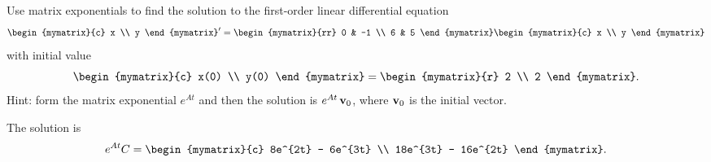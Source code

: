 \begin{ex}
  Use matrix exponentials to find the solution to the
  first-order linear differential equation
  \begin{equation*}
    \begin{mymatrix}{c}
      x \\
      y
    \end{mymatrix}^{\prime } = \begin{mymatrix}{rr}
      0 & -1 \\
      6 & 5
    \end{mymatrix} \begin{mymatrix}{c}
      x \\
      y
    \end{mymatrix}
  \end{equation*}
  with initial value
  \begin{equation*}
    \begin{mymatrix}{c}
      x(0) \\
      y(0)
    \end{mymatrix} =\begin{mymatrix}{r}
      2 \\
      2
    \end{mymatrix}.
  \end{equation*}
  Hint: form the matrix exponential $e^{At}$ and then the solution is
  $e^{At}\,\vect{v}_0$, where $\vect{v}_0$ is the initial vector.
  \begin{sol}
    The solution is
    \begin{equation*}
      e^{At}C = \begin{mymatrix}{c}
        8e^{2t} - 6e^{3t} \\
        18e^{3t} - 16e^{2t}
      \end{mymatrix}.
    \end{equation*}
  \end{sol}
\end{ex}

